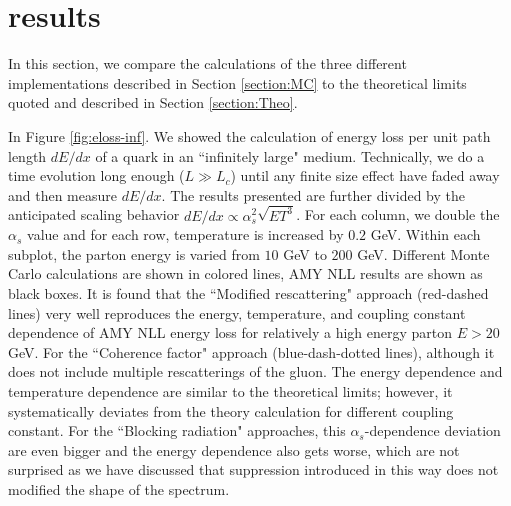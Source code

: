\documentclass[aps, prc, reprint, amsmath, groupedaddress, nofootinbib]{revtex4-1}
\begin{document}
\section{results}\label{section:results}
In this section, we compare the calculations of the three different implementations described in Section \ref{section:MC} to the theoretical limits quoted and described in Section \ref{section:Theo}. 

In Figure \ref{fig:eloss-inf}. We showed the calculation of energy loss per unit path length $dE/dx$ of a quark in an ``infinitely large" medium. 
Technically, we do a time evolution long enough ($L\gg L_c$) until any finite size effect have faded away and then measure $dE/dx$.
The results presented are further divided by the anticipated scaling behavior $dE/dx \propto \alpha_s^2 \sqrt{ET^3}$.
For each column, we double the $\alpha_s$ value and for each row, temperature is increased by $0.2$ GeV. 
Within each subplot, the parton energy is varied from $10$ GeV to $200$ GeV.
Different Monte Carlo calculations are shown in colored lines, AMY NLL results are shown as black boxes. 
It is found that the ``Modified rescattering" approach (red-dashed lines) very well reproduces the energy, temperature, and coupling constant dependence of AMY NLL energy loss for relatively a high energy parton $E>20$ GeV.
For the ``Coherence factor" approach (blue-dash-dotted lines), although it does not include multiple rescatterings of the gluon. The energy dependence and temperature dependence are similar to the theoretical limits; however, it systematically deviates from the theory calculation for different coupling constant.
For the ``Blocking radiation" approaches, this $\alpha_s$-dependence deviation are even bigger and the energy dependence also gets worse, which are not surprised as we have discussed that suppression introduced in this way does not modified the shape of the spectrum.
\end{document}

